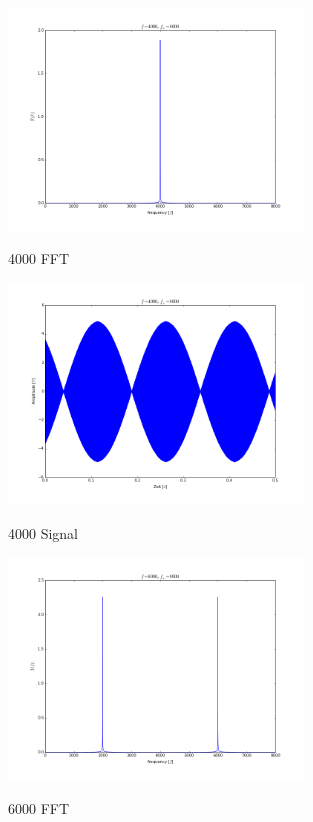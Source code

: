 \documentclass[TGAI_Laborbericht.tex]{subfiles}
\begin{document}
\begin{figure}[H]
	\includegraphics[width=0.7\textwidth]{media/4000-fft.png}
	\label{Hoch}
	\caption{4000 FFT}
\end{figure}

\begin{figure}[H]
	\includegraphics[width=0.7\textwidth]{media/4000-signal.png}
	\label{Hoch}
	\caption{4000 Signal}
\end{figure}

\begin{figure}[H]
	\includegraphics[width=0.7\textwidth]{media/6000-fft.png}
	\label{Hoch}
	\caption{6000 FFT}
\end{figure}
\end{document}
